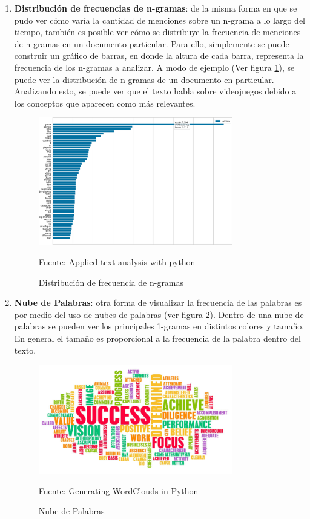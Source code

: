 \begin{enumerate}
    \item \textbf{Distribución de frecuencias de n-gramas}:
        de la misma forma en que se pudo ver cómo varía la cantidad de menciones sobre un n-grama a lo largo del tiempo, también es posible ver cómo se distribuye la frecuencia de menciones de n-gramas en un documento particular. Para ello, simplemente se puede construir un gráfico de barras, en donde la altura de cada barra, representa la frecuencia de los n-gramas a analizar. A modo de ejemplo (Ver figura \ref{fig:DistribucionNgramas}), se puede ver la distribución de n-gramas de un documento en particular. Analizando esto, se puede ver que el texto habla sobre videojuegos debido a los conceptos que aparecen como más relevantes.
     \begin{figure}[h!]
        \centering
        \includegraphics[width=0.8\textwidth]{figures/Distribucion.png}
        \caption{\label{fig:DistribucionNgramas} Distribución de frecuencia de n-gramas} Fuente: Applied text analysis with python \cite{bengfort2018applied}
    \end{figure}
    \item \textbf{Nube de Palabras}: otra forma de visualizar la frecuencia de las palabras es por medio del uso de nubes de palabras (ver figura \ref{fig:WordClouds}). Dentro de una nube de palabras se pueden ver los principales 1-gramas en distintos colores y tamaño. En general el tamaño es proporcional a la frecuencia de la palabra dentro del texto.
    \begin{figure}[H]
        \centering
        \includegraphics[width=0.8\textwidth]{figures/Word-Cloud.png}
        \caption{\label{fig:WordClouds} Nube de Palabras} Fuente: Generating WordClouds in Python \cite{Word_Clouds}
    \end{figure}
\end{enumerate}
